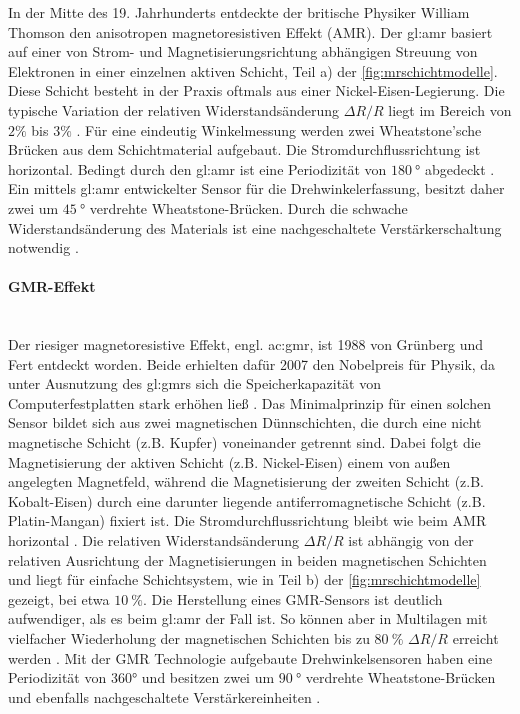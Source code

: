 In der Mitte des 19. Jahrhunderts entdeckte der britische Physiker William Thomson den anisotropen magnetoresistiven Effekt (AMR). Der \gls{gl:amr} basiert auf einer von Strom- und Magnetisierungsrichtung abhängigen Streuung von Elektronen in einer einzelnen aktiven Schicht, Teil a) der \autoref{fig:mrschichtmodelle}. Diese Schicht besteht in der Praxis oftmals aus einer Nickel-Eisen-Legierung. Die typische Variation der relativen Widerstandsänderung $\Delta R/R$ liegt im Bereich von $2\%$ bis $3\%$ \cite{Tille2020}. Für eine eindeutig Winkelmessung werden zwei Wheatstone'sche Brücken aus dem Schichtmaterial aufgebaut. Die Stromdurchflussrichtung ist horizontal. Bedingt durch den \gls{gl:amr} ist eine Periodizität von $\SI{180}{\degree}$ abgedeckt \cite{Lemme2016}\cite{Tille2020}. Ein mittels \gls{gl:amr} entwickelter Sensor für die Drehwinkelerfassung, besitzt daher zwei um $\SI{45}{\degree}$ verdrehte Wheatstone-Brücken. Durch die schwache Widerstandsänderung des Materials ist eine nachgeschaltete Verstärkerschaltung notwendig \cite{NXPSemiconductors2014}.


\paragraph{GMR-Effekt}\label{par:GMR}$~$\\


Der riesiger magnetoresistive Effekt, engl. \gls{ac:gmr},  ist 1988 von Grünberg und Fert entdeckt worden. Beide erhielten dafür 2007 den Nobelpreis für Physik, da unter Ausnutzung des \gls{gl:gmr}s sich die Speicherkapazität von Computerfestplatten stark erhöhen ließ \cite{Lemme2016}. Das Minimalprinzip für einen solchen Sensor bildet sich aus zwei magnetischen Dünnschichten, die durch eine nicht magnetische Schicht (z.B. Kupfer) voneinander getrennt sind. Dabei folgt die Magnetisierung der aktiven Schicht (z.B. Nickel-Eisen) einem von außen angelegten Magnetfeld, während die Magnetisierung der zweiten Schicht (z.B. Kobalt-Eisen) durch eine darunter liegende antiferromagnetische Schicht (z.B. Platin-Mangan) fixiert ist. Die Stromdurchflussrichtung bleibt wie beim AMR horizontal \cite{Lemme2016}\cite{Tille2020}. Die relativen Widerstandsänderung $\Delta R/R$ ist abhängig von der relativen Ausrichtung der Magnetisierungen in beiden magnetischen Schichten und liegt für einfache Schichtsystem, wie in Teil b) der \autoref{fig:mrschichtmodelle} gezeigt, bei etwa $\SI{10}{\percent}$. Die Herstellung eines GMR-Sensors ist deutlich aufwendiger, als es beim \gls{gl:amr} der Fall ist. So können aber in Multilagen mit vielfacher Wiederholung der magnetischen Schichten bis zu
$\SI{80}{\percent}$ $\Delta R/R$ erreicht werden \cite{Tille2020}. Mit der GMR Technologie aufgebaute Drehwinkelsensoren haben eine Periodizität von 360° und besitzen zwei um $\SI{90}{\degree}$ verdrehte Wheatstone-Brücken und ebenfalls nachgeschaltete Verstärkereinheiten \cite{infineon2018}.


